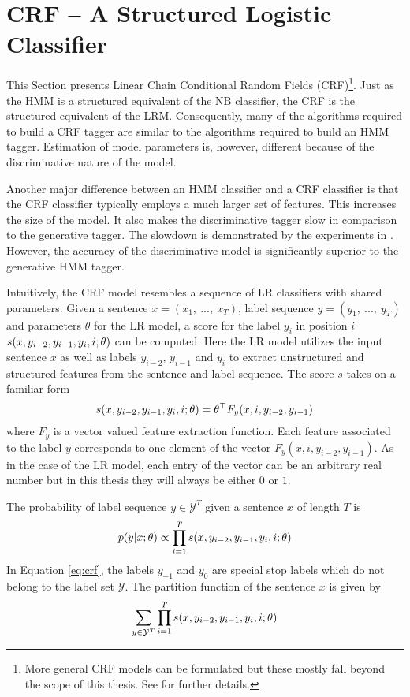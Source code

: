 \section{CRF -- A Structured Logistic Classifier}

This Section presents Linear Chain Conditional Random Fields
(CRF)\footnote{More general CRF models can be formulated but these
  mostly fall beyond the scope of this thesis. See \citep{Sutton2012}
  for further details.}. Just as the HMM is a structured equivalent of
the NB classifier, the CRF is the structured equivalent of the
LRM. Consequently, many of the algorithms required to build a CRF
tagger are similar to the algorithms required to build an HMM
tagger. Estimation of model parameters is, however, different because
of the discriminative nature of the model.

Another major difference between an HMM classifier and a CRF
classifier is that the CRF classifier typically employs a much larger
set of features. This increases the size of the model. It also makes
the discriminative tagger slow in comparison to the generative
tagger. The slowdown is demonstrated by the experiments in
\cite{Silfverberg2015}. However, the accuracy of the discriminative
model is significantly superior to the generative HMM tagger.

Intuitively, the CRF model resembles a sequence of LR classifiers
with shared parameters. Given a sentence $x = (x_1,\ ...,\ x_T)$,
label sequence $y = (y_1,\ ...,\ y_T)$ and parameters $\theta$ for the
LR model, a score for the label $y_i$ in position $i$ $s(x, y_{i-2},
y_{i-1}, y_i, i\mbox{$ ; \, $} \theta)$ can be computed. Here the LR model
utilizes the input sentence $x$ as well as labels $y_{i - 2}$, $y_{i-1}$ and
$y_i$ to extract unstructured and structured features from the
sentence and label sequence. The score $s$ takes on a familiar form
$$s(x, y_{i-2}, y_{i-1}, y_i, i\mbox{$ ; \, $} \theta) = \theta^\top F_y(x, i, y_{i-2}, y_{i-1})$$
where $F_y$ is a vector valued feature extraction function. Each
feature associated to the label $y$ corresponds to one element of the
vector $F_y(x, i, y_{i-2}, y_{i-1})$. As in the case of the LR model,
each entry of the vector can be an arbitrary real number but in this
thesis they will always be either $0$ or $1$.

The probability of label sequence $y \in \mathcal{Y}^T$ given a sentence $x$ of length $T$ is
\begin{equation}\label{eq:crf}p(y|x\mbox{$ ; \, $}\theta) \propto \prod_{i = 1}^T s(x, y_{i-2}, y_{i-1}, y_i, i\mbox{$ ; \, $} \theta)\end{equation}
In Equation \ref{eq:crf}, the labels $y_{-1}$ and $y_0$ are special
stop labels which do not belong to the label set $\mathcal{Y}$. The partition function of the sentence $x$ is given by
\begin{equation}\sum_{y\in \mathcal{Y}^T}\prod_{i = 1}^T s(x, y_{i-2}, y_{i-1}, y_i, i\mbox{$ ; \, $} \theta)\end{equation}

